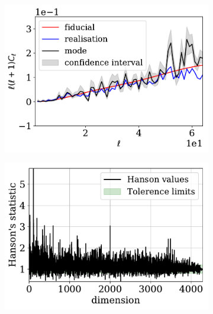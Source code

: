 \begin{figure}
\begin{subfigure}{.5\textwidth}
  \includegraphics[scale=0.50]{BPL-FIGS/Euclid-LN-PNoi-N32-HDens_HPDCls.pdf}
  \caption{}
  \label{fig:BPL:LN-HighSN-Cls}
\end{subfigure}
\begin{subfigure}{.5\textwidth}
  \centering
  \includegraphics[scale=0.50]{BPL-FIGS/Euclid-LN-PNoi-N32-HDens_Hanson.pdf}
  \caption{}
  \label{fig:BPL:LN-HighSN-Hanson}
\end{subfigure}

\end{figure}
